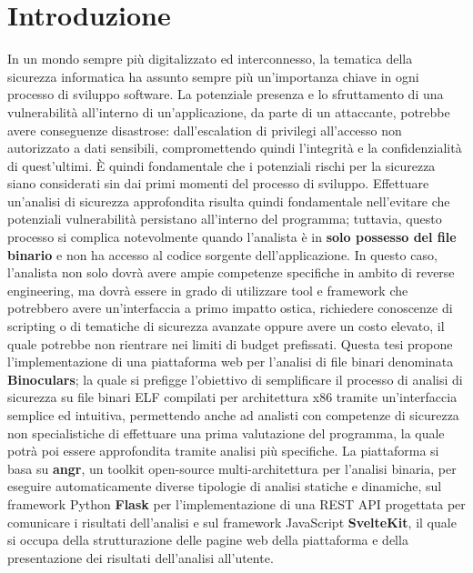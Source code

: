 \documentclass[../main.tex]{subfiles}
\begin{document}
\chapter{Introduzione}
\label{chap:intro}
In un mondo sempre più digitalizzato ed interconnesso, la tematica della sicurezza informatica ha assunto sempre più un'importanza chiave in ogni processo di sviluppo software. 
La potenziale presenza e lo sfruttamento di una vulnerabilità all'interno di un'applicazione, da parte di un attaccante, potrebbe avere conseguenze disastrose: dall'escalation di privilegi
all'accesso non autorizzato a dati sensibili, compromettendo quindi l'integrità e la confidenzialità di quest'ultimi.
È quindi fondamentale che i potenziali rischi per la sicurezza siano considerati sin dai primi momenti del processo di sviluppo.
Effettuare un'analisi di sicurezza approfondita risulta quindi fondamentale nell'evitare che potenziali vulnerabilità persistano all'interno del programma; tuttavia, questo processo
si complica notevolmente quando l'analista è in \textbf{solo possesso del file binario} e non ha accesso al codice sorgente dell'applicazione.
In questo caso, l'analista non solo dovrà avere ampie competenze specifiche in ambito di reverse engineering, ma dovrà essere in grado di utilizzare tool e framework che potrebbero avere
un'interfaccia a primo impatto ostica, richiedere conoscenze di scripting o di tematiche di sicurezza avanzate oppure avere un costo elevato, il quale potrebbe non rientrare nei limiti
di budget prefissati. 
Questa tesi propone l'implementazione di una piattaforma web per l'analisi di file binari denominata \textbf{Binoculars}; la quale si prefigge l'obiettivo di
semplificare il processo di analisi di sicurezza su file binari ELF compilati per architettura x86 tramite un'interfaccia semplice ed intuitiva, permettendo anche ad analisti con competenze di sicurezza non specialistiche di 
effettuare una prima valutazione del programma, la quale potrà poi essere approfondita tramite analisi più specifiche.
La piattaforma si basa su \textbf{angr}, un toolkit open-source multi-architettura per l'analisi binaria, per eseguire automaticamente diverse tipologie di analisi statiche e dinamiche, sul framework Python \textbf{Flask} per l'implementazione di una REST API progettata per 
comunicare i risultati dell'analisi e sul framework JavaScript \textbf{SvelteKit}, il quale si occupa della strutturazione delle pagine web della piattaforma e della presentazione dei risultati dell'analisi all'utente.
\end{document}
